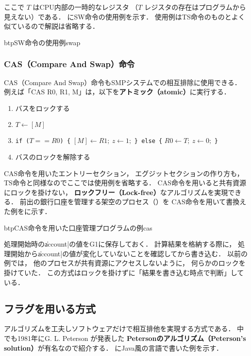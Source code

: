 ここで $T$ はCPU内部の一時的なレジスタ
（$T$ レジスタの存在はプログラムから見えない）である．
にSW命令の使用例を示す．
使用例はTS命令のものとよく似ているので解説は省略する．

\begin{myfig}{btp}{SW命令の使用例}{swap}

\end{myfig}

\subsubsection{CAS（Compare And Swap）命令}
CAS（Compare And Swap）命令もSMPシステムでの相互排除に使用できる．
例えば「CAS  R0, R1, M」は，以下を{\bf アトミック（atomic）}に実行する．

\begin{enumerate}
\item バスをロックする
\item $T \leftarrow [M]$
\item {\tt if ($T==R0$) \{} $[M] \leftarrow R1;~ z \leftarrow 1;$
      {\tt \} else \{} $R0 \leftarrow T;~  z \leftarrow 0;$ {\tt \}}
\item バスのロックを解除する
\end{enumerate}

CAS命令を用いたエントリーセクション，
エグジットセクションの作り方も，
TS命令と同様なのでここでは使用例を省略する．
CAS命令を用いると共有資源にロックを掛けない，
{\bf ロックフリー（Lock-free）}なアルゴリズムを実現できる．
前出の銀行口座を管理する架空のプロセス（）を
CAS命令を用いて書換えた例をに示す．

\begin{myfig}{btp}{CAS命令を用いた口座管理プログラムの例}{cas}

\end{myfig}

処理開始時の\|account|の値をG1に保存しておく．
計算結果を格納する際に，
処理開始から\|account|の値が変化していないことを確認してから書き込む．
以前の例では，
他のプロセスが共有資源にアクセスしないように，
何らかのロックを掛けていた．
この方式はロックを掛けずに「結果を書き込む時点で判断」している．

\subsection{フラグを用いる方式}
アルゴリズムを工夫しソフトウェアだけで相互排他を実現する方式である．
中でも1981年にG. L. Peterson が発表した
{\bf Petersonのアルゴリズム（Peterson's solution）}が有名なので紹介する．
にJava風の言語で書いた例を示す．

